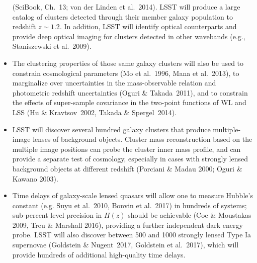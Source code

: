 \begin{itemize}
(SciBook, Ch.~13; von der Linden et al.~2014). LSST will produce a large catalog of clusters detected through their member galaxy population
to redshift $z\sim 1.2$.  In addition, LSST will identify optical counterparts and provide deep optical
imaging for clusters detected in other wavebands (e.g., Staniszewski et al.~2009).
\item The clustering properties of those same galaxy clusters will also be used to constrain
  cosmological parameters (Mo et al.~1996, Mana et al.~2013), to marginalize over uncertainties in
  the mass-observable relation and photometric redshift uncertainties (Oguri \& Takada~2011), and to constrain the effects of super-sample covariance in the two-point functions of WL and LSS (Hu \& Kravtsov~2002, Takada \& Spergel~2014).
\item LSST will discover several hundred galaxy clusters that produce multiple-image lenses of background objects.
Cluster mass reconstruction based on the multiple image positions
 can probe the cluster inner mass profile, and can provide a separate test of cosmology, especially
in cases with strongly lensed background objects at different redshift (Porciani \& Madau 2000; Oguri \& Kawano 2003).
\item Time delays of galaxy-scale lensed quasars will allow one to measure Hubble's constant
(e.g. Suyu et al.~2010, Bonvin et al.~2017) in hundreds of systems; sub-percent level precision in
$H(z)$ should be achievable (Coe \& Moustakas 2009, Treu \& Marshall 2016), providing a further independent dark energy probe.
LSST will also discover between 500 and 1000 strongly lensed Type Ia supernovae (Goldstein \& Nugent~2017, Goldstein et al.~2017), which will provide hundreds of additional high-quality time delays.

\end{itemize}
